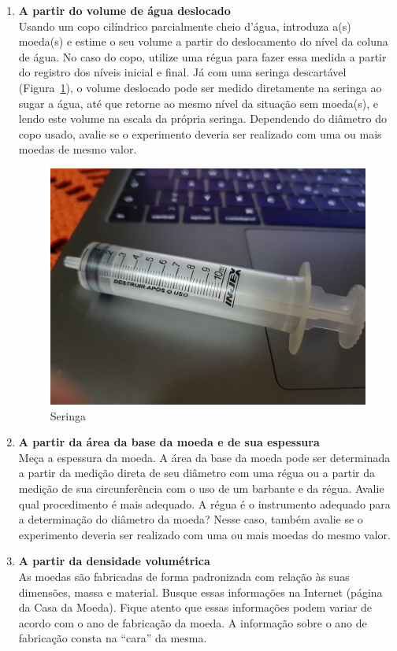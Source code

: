 \begin{enumerate}
\item {\bf A partir do volume de água deslocado}\\ 

Usando um copo cilíndrico parcialmente cheio d'água, introduza a(s) moeda(s) e estime o seu volume a partir do deslocamento do nível da coluna de água. No caso do copo, utilize uma régua para fazer essa medida a partir do registro dos níveis inicial e final.  Já com uma seringa descartável (Figura~\ref{fig:seringa}), o volume deslocado pode ser medido diretamente na seringa ao sugar a água, até que retorne ao mesmo nível da situação sem moeda(s), e lendo este volume na escala da própria seringa.  Dependendo do diâmetro do copo usado, avalie se o experimento deveria ser realizado com uma ou mais moedas de mesmo valor.

\begin{figure}[!hbt]
\centering
\includegraphics[height=0.18\paperheight]{Figuras_exp2/Foto3.jpeg}
\caption{\label{fig:seringa} Seringa}
\end{figure}


\item {\bf A partir da área da base da moeda  e de sua espessura}\\
Me\c ca  a espessura da moeda.  A área da base da moeda pode ser determinada  a partir da medição direta de seu diâmetro com uma régua ou a partir da medição de sua circunferência com o uso de um barbante e da régua.  Avalie qual procedimento é mais adequado.  A régua é o instrumento adequado para a determinação do 
di\^ametro da moeda? Nesse caso, tamb\'em avalie se o experimento deveria ser realizado com uma ou mais moedas do mesmo valor.

\item {\bf A partir da densidade volumétrica} \\
As moedas são fabricadas de forma padronizada  com relação às suas dimensões, massa e material.
Busque essas informações na Internet (página da Casa da Moeda). Fique atento que essas informações  podem variar de acordo com o ano de fabricação da moeda. A informação sobre o ano de fabricação consta na ``cara'' da mesma.
\end{enumerate}


